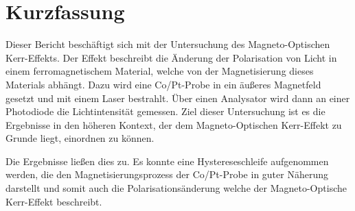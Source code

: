 \section{Kurzfassung}

	Dieser Bericht beschäftigt sich mit der Untersuchung des Magneto-Optischen Kerr-Effekts.
	Der Effekt beschreibt die Änderung der Polarisation von Licht in einem ferromagnetischem Material, welche von der Magnetisierung dieses Materials abhängt.
	Dazu wird eine Co/Pt-Probe in ein äußeres Magnetfeld gesetzt und mit einem Laser bestrahlt.
	Über einen Analysator wird dann an einer Photodiode die Lichtintensität gemessen.
	Ziel dieser Untersuchung ist es die Ergebnisse in den höheren Kontext, der dem Magneto-Optischen Kerr-Effekt zu Grunde liegt, einordnen zu können.
	
	Die Ergebnisse ließen dies zu.
	Es konnte eine Hystereseschleife aufgenommen werden, die den Magnetisierungsprozess der Co/Pt-Probe in guter Näherung darstellt und somit auch die Polarisationsänderung welche der Magneto-Optische Kerr-Effekt beschreibt.